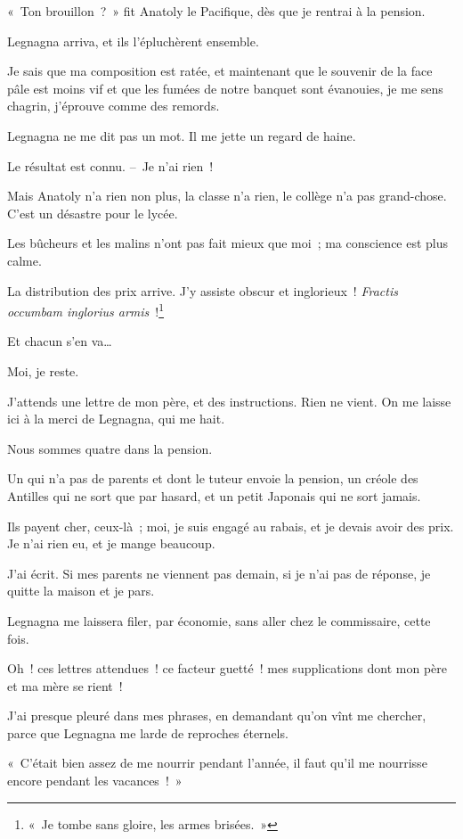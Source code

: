 \documentclass[french,twoside]{book} %
\begin{document}
\bigbreak
\noindent « Ton brouillon ? » fit Anatoly le Pacifique, dès que je rentrai à la pension.\par
Legnagna arriva, et ils l’épluchèrent ensemble.\par
Je sais que ma composition est ratée, et maintenant que le souvenir de la face pâle est moins vif et que les fumées de notre banquet sont évanouies, je me sens chagrin, j’éprouve comme des remords.\par
Legnagna ne me dit pas un mot. Il me jette un regard de haine.\par
\bigbreak
\noindent Le résultat est connu. – Je n’ai rien !\par
Mais Anatoly n’a rien non plus, la classe n’a rien, le collège n’a pas grand-chose. C’est un désastre pour le lycée.\par
Les bûcheurs et les malins n’ont pas fait mieux que moi ; ma conscience est plus calme.\par
La distribution des prix arrive. J’y assiste obscur et inglorieux ! \emph{Fractis occumbam inglorius armis} !\footnote{« Je tombe sans gloire, les armes brisées. »}\par
Et chacun s’en va…\par
\bigbreak
\noindent Moi, je reste.\par
J’attends une lettre de mon père, et des instructions. Rien ne vient. On me laisse ici à la merci de Legnagna, qui me hait.\par
Nous sommes quatre dans la pension.\par
Un qui n’a pas de parents et dont le tuteur envoie la pension, un créole des Antilles qui ne sort que par hasard, et un petit Japonais qui ne sort jamais.\par
Ils payent cher, ceux-là ; moi, je suis engagé au rabais, et je devais avoir des prix. Je n’ai rien eu, et je mange beaucoup.\par
\bigbreak
\noindent J’ai écrit. Si mes parents ne viennent pas demain, si je n’ai pas de réponse, je quitte la maison et je pars.\par
Legnagna me laissera filer, par économie, sans aller chez le commissaire, cette fois.\par
Oh ! ces lettres attendues ! ce facteur guetté ! mes supplications dont mon père et ma mère se rient !\par
J’ai presque pleuré dans mes phrases, en demandant qu’on vînt me chercher, parce que Legnagna me larde de reproches éternels.\par
« C’était bien assez de me nourrir pendant l’année, il faut qu’il me nourrisse encore pendant les vacances ! »\par
\end{document}
